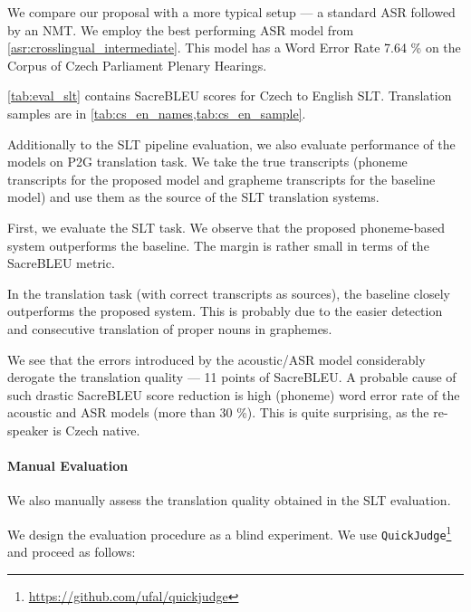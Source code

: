 We compare our proposal with a more typical setup --- a standard ASR followed by an NMT. We employ the best performing ASR model from \cref{asr:crosslingual_intermediate}. This model has a Word Error Rate 7.64 \% on the Corpus of Czech Parliament Plenary Hearings.

\cref{tab:eval_slt} contains SacreBLEU scores for Czech to English SLT. Translation samples are in \cref{tab:cs_en_names,tab:cs_en_sample}.

Additionally to the SLT pipeline evaluation, we also evaluate performance of the models on P2G translation task. We take the true transcripts (phoneme transcripts for the proposed model and grapheme transcripts for the baseline model) and use them as the source of the SLT translation systems.

First, we evaluate the SLT task. We observe that the proposed phoneme-based system outperforms the baseline. The margin is rather small in terms of the SacreBLEU metric.

In the translation task (with correct transcripts as sources), the baseline closely outperforms the proposed system. This is probably due to the easier detection and consecutive translation of proper nouns in graphemes.

We see that the errors introduced by the acoustic/ASR model considerably derogate the translation quality --- 11 points of SacreBLEU. A probable cause of such drastic SacreBLEU score reduction is high (phoneme) word error rate of the acoustic and ASR models (more than 30 \%). This is quite surprising, as the re-speaker is Czech native.

\paragraph{Manual Evaluation}
We also manually assess the translation quality obtained in the SLT evaluation.

We design the evaluation procedure as a blind experiment. We use \texttt{QuickJudge}\footnote{\url{https://github.com/ufal/quickjudge}} and proceed as follows:


